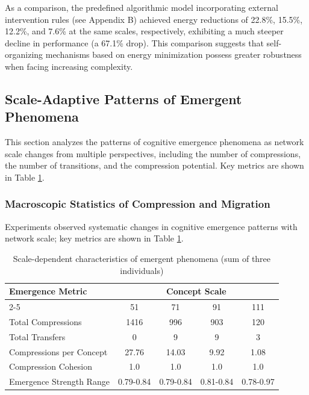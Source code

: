 \documentclass[10pt,onecolumn]{article}
\begin{document}
As a comparison, the predefined algorithmic model incorporating external intervention rules (see Appendix B) achieved energy reductions of 22.8\%, 15.5\%, 12.2\%, and 7.6\% at the same scales, respectively, exhibiting a much steeper decline in performance (a 67.1\% drop). This comparison suggests that self-organizing mechanisms based on energy minimization possess greater robustness when facing increasing complexity.

\subsection{Scale-Adaptive Patterns of Emergent Phenomena}
\label{sec:scale_dependent_emergence}

This section analyzes the patterns of cognitive emergence phenomena as network scale changes from multiple perspectives, including the number of compressions, the number of transitions, and the compression potential. Key metrics are shown in Table \ref{tab:scale_dependent_emergence}.

\subsubsection{Macroscopic Statistics of Compression and Migration}

Experiments observed systematic changes in cognitive emergence patterns with network scale; key metrics are shown in Table \ref{tab:scale_dependent_emergence}.

\begin{table}[H]
\small
\centering
\caption{Scale-dependent characteristics of emergent phenomena (sum of three individuals)}
\label{tab:scale_dependent_emergence}
\begin{tabular}{lcccc}
\toprule
\textbf{Emergence Metric} & \multicolumn{4}{c}{\textbf{Concept Scale}} \\
\cmidrule(lr){2-5}
& 51 & 71 & 91 & 111 \\
\midrule
Total Compressions & 1416 & 996 & 903 & 120 \\
Total Transfers & 0 & 9 & 9 & 3 \\
Compressions per Concept & 27.76 & 14.03 & 9.92 & 1.08 \\
Compression Cohesion & 1.0 & 1.0 & 1.0 & 1.0 \\
Emergence Strength Range & 0.79-0.84 & 0.79-0.84 & 0.81-0.84 & 0.78-0.97 \\
\bottomrule
\end{tabular}
\end{table}
\end{document}

